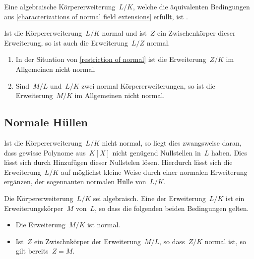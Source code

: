 \begin{definition}
  Eine algebraische Körpererweiterung~$L/K$, welche die äquivalenten Bedingungen aus \cref{characterizations of normal field extensions} erfüllt, ist .
\end{definition}

\begin{proposition}
  \label{restriction of normal}
  Ist die Körpererweiterung~$L/K$ normal und ist~$Z$ ein Zwischenkörper dieser Erweiterung, so ist auch die Erweiterung~$L/Z$ normal.
\end{proposition}

\begin{warning}
  \leavevmode
  \begin{enumerate}
    \item
      In der Situation von \cref{restriction of normal} ist die Erweiterung~$Z/K$ im Allgemeinen nicht normal.
    \item
      Sind~$M/L$ und~$L/K$ zwei normal Körpererweiterungen, so ist die Erweiterung~$M/K$ im Allgemeinen nicht normal.
  \end{enumerate}
\end{warning}



\subsection{Normale Hüllen}

Ist die Körpererweiterung~$L/K$ nicht normal, so liegt dies zwangsweise daran, dass gewisse Polynome aus~$K[X]$ nicht genügend Nullstellen in~$L$ haben.
Dies lässt sich durch Hinzufügen dieser Nullstelen lösen.
Hierdurch lässt sich die Erweiterung~$L/K$ auf möglichst kleine Weise durch einer normalen Erweiterung ergänzen, der sogennanten normalen Hülle von~$L/K$.

\begin{definition}
  Die Körpererweiterung~$L/K$ sei algebraisch.
  Eine  der Erweiterung~$L/K$ ist ein Erweiterungskörper~$M$ von~$L$, so dass die folgenden beiden Bedingungen gelten.
  \begin{itemize}
    \item
      Die Erweiterung~$M/K$ ist normal.
    \item
      Ist~$Z$ ein Zwischnkörper der Erweiterung~$M/L$, so dass~$Z/K$ normal ist, so gilt bereits~$Z = M$.
  \end{itemize}
\end{definition}

